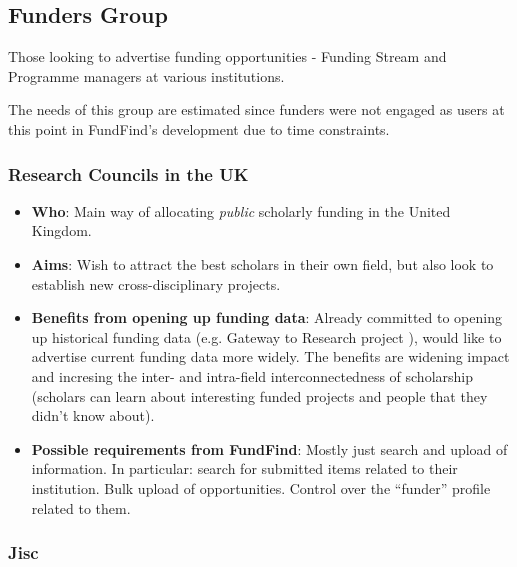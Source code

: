 \subsection{Funders Group}
Those looking to advertise funding opportunities - Funding Stream and Programme managers at various institutions.

The needs of this group are estimated since funders were not engaged as users at this point in FundFind's development due to time constraints.

\subsubsection{Research Councils in the UK}

\begin{itemize}
 \item \textbf{Who}: Main way of allocating \emph{public} scholarly funding in the United Kingdom.
 \item \textbf{Aims}: Wish to attract the best scholars in their own field, but also look to establish new cross-disciplinary  projects.
 \item \textbf{Benefits from opening up funding data}: Already committed to opening up historical funding data (e.g. Gateway to Research project \cite{rcuk-on-gtr}), would like to advertise current funding data more widely. The benefits are widening impact and incresing the inter- and intra-field interconnectedness of scholarship (scholars can learn about interesting funded projects and people that they didn't know about).
 \item \textbf{Possible requirements from FundFind}: Mostly just search and upload of information. In particular: search for submitted items related to their institution. Bulk upload of opportunities. Control over the ``funder'' profile related to them.
\end{itemize}

\subsubsection{Jisc}

